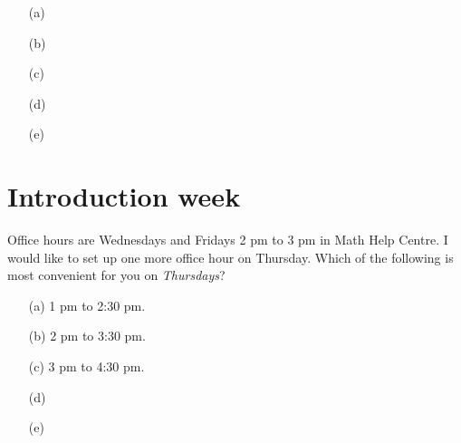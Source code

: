 \documentclass[14pt]{beamer}
\begin{document}
 

%

\begin{frame}[c]
  \thispagestyle{empty}

  \begin{itemize} \setlength\itemsep{3ex}
    \item[(a)] \underline{\hspace{4in}}
    \item[(b)] \underline{\hspace{4in}}
    \item[(c)] \underline{\hspace{4in}}
    \item[(d)] \underline{\hspace{4in}}
    \item[(e)] \underline{\hspace{4in}}
  \end{itemize} 
\end{frame}

\section{Introduction week}

\begin{frame}[t]
  Office hours are Wednesdays and Fridays 2 pm to 3 pm in Math Help Centre.  I would like to set up one more office hour on Thursday. Which of the following is most convenient for you on \emph{Thursdays}?

  \begin{itemize} \setlength\itemsep{1ex}
    \item[(a)] 1 pm to 2:30 pm.
    \item[(b)] 2 pm to 3:30 pm.
    \item[(c)] 3 pm to 4:30 pm.
    \item[(d)] 
    \item[(e)] 
  \end{itemize} 
\end{frame}
\end{document}

